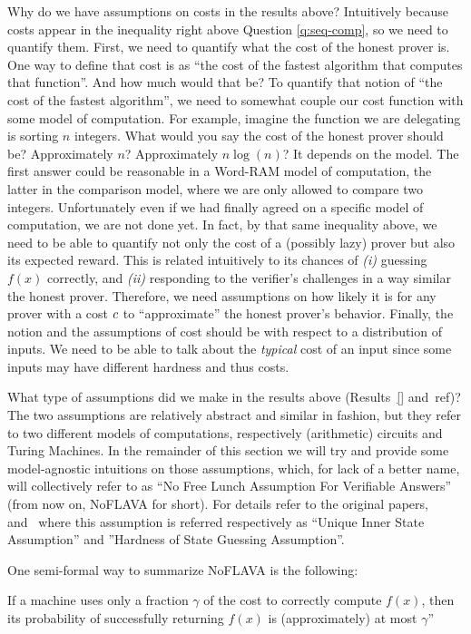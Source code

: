 Why do we have assumptions on costs in the results above?
Intuitively because costs appear in the inequality right above Question \ref{q:seq-comp}, so we need to quantify them.
First, we need to quantify what the cost of the honest prover is. One way to define that cost is as ``the cost of the fastest algorithm that computes that function''.
And how much would that be? To quantify that notion of ``the cost of the fastest algorithm'', we need to somewhat couple our cost function with some model of computation.
For example, imagine the function we are delegating is sorting $n$ integers. What would you say the cost of the honest prover should be? Approximately $n$? Approximately $n \log(n)$?
It depends on the model. The first answer could be reasonable in a Word-RAM model of computation, the latter in the comparison model, where we are only allowed to compare two integers.
Unfortunately even if we had finally agreed on a specific model of computation, we are not done yet. In fact, by that same inequality above, we need to be able to quantify not only the cost of a (possibly lazy) prover
but also its expected reward. This is related intuitively to its chances of \emph{(i)} guessing $f(x)$ correctly, and \emph{(ii)} responding to the verifier's challenges
in a way similar the honest prover. Therefore, we need assumptions on how likely it is for any prover with a cost $c$ to ``approximate'' the honest prover's behavior.
Finally, the notion and the assumptions of cost should be with respect to a distribution of inputs. We need to be able to talk about the \emph{typical} cost of an input since some inputs may have different hardness and thus costs. 

\newcommand{\NoFLAVA}{\textsf{ NoFLAVA }}
What type of assumptions did we make in the results above (Results~\ref{} and~ref{})? The two assumptions are relatively abstract and similar in fashion, but they refer to two different models of computations, respectively (arithmetic) circuits and Turing Machines. In the remainder of this section we will try and provide some model-agnostic intuitions on those assumptions, which, for lack of a better name, will collectively refer  to as ``No Free Lunch Assumption For Verifiable Answers'' (from now on, \NoFLAVA for short). For details refer to the original papers,~\cite{cg15} and~\cite{cg17} where this assumption is referred respectively as ``Unique Inner State Assumption'' and ''Hardness of State Guessing Assumption''.

One semi-formal way to summarize \NoFLAVA is the following: 
\begin{displayquote}
	If a machine uses only a fraction $\gamma$ of the cost to correctly compute $f(x)$, then its probability of successfully returning $f(x)$ is (approximately) at most $\gamma$''
\end{displayquote}

